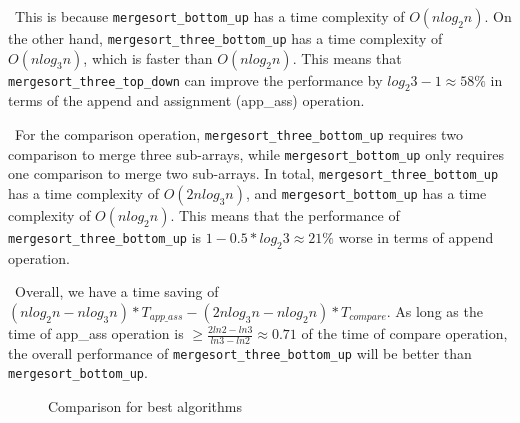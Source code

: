 \documentclass[12pt]{article}
\begin{document}
~\newline\noindent This is because \verb|mergesort_bottom_up| 
has a time complexity of $O(nlog_{2}n)$. On the other hand, 
\verb|mergesort_three_bottom_up| has a time complexity of 
$O(nlog_{3}n)$, which is faster than $O(nlog_{2}n)$. This means that \verb|mergesort_three_top_down| can improve the performance by $log_2 3 -1\approx 58\%$ in terms of the append and assignment (app\_ass) operation.

~\newline\noindent For the comparison operation, \verb|mergesort_three_bottom_up| requires two comparison to merge three sub-arrays, while \verb|mergesort_bottom_up| only requires one comparison to merge two sub-arrays. In total, \verb|mergesort_three_bottom_up| has a time complexity of $O(2nlog_{3}n)$, and \verb|mergesort_bottom_up| has a time complexity of $O(nlog_{2}n)$. This means that the performance of \verb|mergesort_three_bottom_up| is $1 - 0.5 * log_2 3  \approx 21\%$ worse in terms of append operation.

~\newline\noindent  Overall, we have a time saving of $(nlog_2 n - nlog_3 n) * T_{app\_ass} - (2nlog_3n - nlog_2 n) * T_{compare} $. As long as the time of app\_ass operation is $\ge \frac{2ln2-ln3}{ln3-ln2} \approx 0.71$ of the time of compare operation, the overall performance of \verb|mergesort_three_bottom_up| will be better than \verb|mergesort_bottom_up|.
  
\begin{figure}[hbt!]
  \centering
  \hfill
  \caption{Comparison for best algorithms}
\end{figure}
\end{document}
